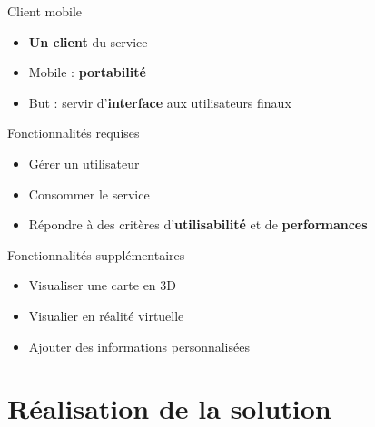 \documentclass{beamer} %
\begin{document}
  \begin{frame}{\subsecname}
    \begin{block}{Client mobile}
      \begin{itemize}
        \item \textbf{Un client} du service
        \item Mobile : \textbf{portabilité}
        \item But : servir d'\textbf{interface} aux utilisateurs finaux
      \end{itemize}
    \end{block}

    \pause

    \begin{alertblock}{Fonctionnalités requises}
      \begin{itemize}
        \item Gérer un utilisateur
        \item Consommer le service
        \item Répondre à des critères d'\textbf{utilisabilité} et de \textbf{performances}
      \end{itemize}
    \end{alertblock}

    \pause

    \begin{exampleblock}{Fonctionnalités supplémentaires}
      \begin{itemize}
        \item Visualiser une carte en 3D
        \item Visualier en réalité virtuelle
        \item Ajouter des informations personnalisées
      \end{itemize}
    \end{exampleblock}

  \end{frame}


  \section{Réalisation de la solution}
\end{document}
